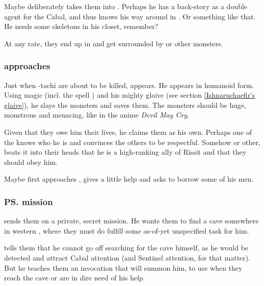 Maybe \Dzasselid{} deliberately takes them into \Nyx. Perhaps he has a back-story as a double agent for the Cabal, and thus knows his way around in \Nyx. Or something like that. He needs some skeletons in his closet, remember?

At any rate, they end up in \Nyx{} and get surrounded by \banes{} or other monsters. 






\subsubsection{\Ishnaruchaefir{} approaches}
Just when \Shilred-tachi are about to be killed, \Ishnaruchaefir{} appears. He appears in humanoid form. Using magic (incl. the spell ) and his mighty glaive (see section \ref{Ishnaruchaefir's glaive}), he slays the monsters and saves them. The monsters should be huge, monstrous and menacing, like in the anime \emph{Devil May Cry}. 

Given that they owe him their lives, he claims them as his own. Perhaps one of the \Gisshorns{} knows who he is and convinces the others to be respectful. Somehow or other, \Ishnaruchaefir{} beats it into their heads that he is a high-ranking ally of Rissit and that they should obey him. 

Maybe \Ishnaruchaefir{} first approaches \Narkiza{}, gives a little help and asks to borrow some of his men. 






\subsubsection{\ps{\Ishnaruchaefir} mission}
\Ishnaruchaefir{} sends them on a private, secret mission. He wants them to find a cave somewhere in western \Velcad{}, where they must do fulfill some as-of-yet unspecified task for him. 

\Ishnaruchaefir{} tells them that he cannot go off searching for the cave himself, as he would be detected and attract Cabal attention (and Sentinel attention, for that matter). But he teaches them an invocation that will summon him, to use when they reach the cave or are in dire need of his help. 









